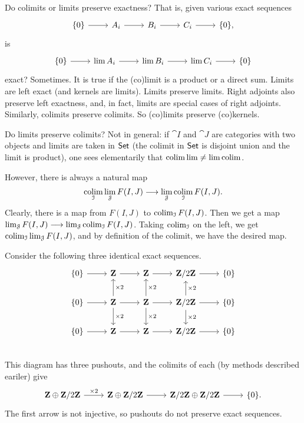 \documentclass[11pt, oneside,margin=1in]{article}
\begin{document}
Do colimits or limits preserve exactness? That is, given various exact sequences
\[
\begin{tikzcd}
	\{0\} \arrow[r] & A_i \arrow[r] & B_i \arrow[r] & C_i \arrow[r] & \{0\},
\end{tikzcd}
\]
is
\[
\begin{tikzcd}
        \{0\} \arrow[r] & \lim A_i \arrow[r] &\lim B_i \arrow[r] &\lim C_i \arrow[r] & \{0\}
\end{tikzcd}
\]
exact? Sometimes. It is true if the (co)limit is a product or a direct sum. Limits are left exact (and kernels are limits). Limits preserve limits. Right adjoints also preserve left exactness, and, in fact, limits are special cases of right adjoints. Similarly, colimits preserve colimits. So (co)limits preserve (co)kernels.

Do limits preserve colimits? Not in general: if $\cat I$ and $\cat J$ are categories with two objects and limits are taken in $\textsf{Set}$ (the colimit in $\textsf{Set}$ is disjoint union and the limit is product), one sees elementarily that $\operatorname*{colim} \lim \ne \lim \operatorname*{colim}$. 

However, there is always a natural map
\begin{align*}
	\operatorname*{colim}_{\mathcal I} \lim_{\mathcal J} F(I,J)  \longrightarrow \lim_{\mathcal J} \operatorname*{colim}_{\mathcal I} F(I,J).
\end{align*}
Clearly, there is a map from $F(I,J)$ to $\operatorname*{colim}_{\mathcal I} F(I, J)$. Then we get a map $\lim_{\mathcal J} F(I,J) \longrightarrow \lim_{\mathcal J}\operatorname*{colim}_{\mathcal I} F(I,J)$. Taking $\operatorname*{colim}_{\mathcal I}$ on the left, we get $\operatorname*{colim}_{\mathcal I} \lim_{\mathcal J} F(I, J)$, and by definition of the colimit, we have the desired map. 

\begin{example}\label{}
Consider the following three identical exact sequences.
\[
\begin{tikzcd}
\{0\} \arrow[r] & \Z \arrow[r] & \Z\arrow[r]& \Zmod 2\arrow[r] & \{0\}\\
\{0\} \arrow[r] & \Z \arrow[r]\arrow[u, "\times 2", swap]\arrow[d, "\times 2"] & \Z\arrow[r]\arrow[u, "\times 2", swap]\arrow[d, "\times 2"]& \Zmod 2\arrow[r] \arrow[u, "\times 2",swap] \arrow[d, "\times 2"]& \{0\}\\
\{0\} \arrow[r] & \Z \arrow[r] & \Z\arrow[r]& \Zmod 2\arrow[r] & \{0\}\\
\end{tikzcd}
\]
This diagram has three pushouts, and the colimits of each (by methods described eariler) give
\[
\begin{tikzcd}
	\Z\oplus \Zmod 2 \arrow[r, "\times 2"] & \Z\oplus \Zmod 2 \arrow[r] & \Zmod 2\oplus \Zmod 2 \arrow[r] & \{0\}.
\end{tikzcd}
\]
The first arrow is not injective, so pushouts do not preserve exact sequences.
\end{example}
\end{document}
